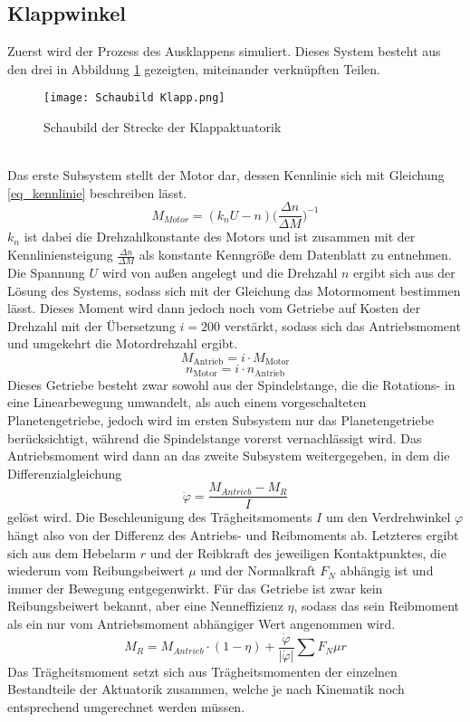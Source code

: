 \subsection{Klappwinkel}
Zuerst wird der Prozess des Ausklappens simuliert. Dieses System besteht aus den drei in Abbildung \ref{abb_klappStrecke} gezeigten, miteinander verknüpften Teilen. 
\begin{figure}[h] 
	\centering
	\texttt{[image: Schaubild Klapp.png]}
	\caption{Schaubild der Strecke der Klappaktuatorik}
	\label{abb_klappStrecke}
\end{figure}\\
Das erste Subsystem stellt der Motor dar, dessen Kennlinie sich mit Gleichung \ref{eq_kennlinie} beschreiben lässt.
\begin{equation}\label{eq_kennlinie}
	M_{Motor} = (k_nU-n)\bigg(\frac{\Delta n}{\Delta M}\bigg)^{-1}
\end{equation}
$k_n$ ist dabei die Drehzahlkonstante des Motors und ist zusammen mit der Kennliniensteigung $\frac{\Delta n}{\Delta M}$ als konstante Kenngröße dem Datenblatt zu entnehmen. Die Spannung $U$ wird von außen angelegt und die Drehzahl $n$ ergibt sich aus der Lösung des Systems, sodass sich mit der Gleichung das Motormoment bestimmen lässt. Dieses Moment wird dann jedoch noch vom Getriebe auf Kosten der Drehzahl mit der Übersetzung $i = 200$ verstärkt, sodass sich das Antriebsmoment und umgekehrt die Motordrehzahl ergibt.
\begin{equation}
	M_\mathrm{Antrieb} = i \cdot M_\mathrm{Motor}
\end{equation}
\begin{equation}
	n_\mathrm{Motor} = i \cdot n_\mathrm{Antrieb}
\end{equation}
 Dieses Getriebe besteht zwar sowohl aus der Spindelstange, die die Rotations- in eine Linearbewegung umwandelt, als auch einem vorgeschalteten Planetengetriebe, jedoch wird im ersten Subsystem nur das Planetengetriebe berücksichtigt, während die Spindelstange vorerst vernachlässigt wird. Das Antriebsmoment wird dann an das zweite Subsystem weitergegeben, in dem die Differenzialgleichung
\begin{equation}
	\ddot{\varphi} = \frac{M_{Antrieb} - M_{R}}{I}
\end{equation}
gelöst wird. Die Beschleunigung des Trägheitsmoments $I$ um den Verdrehwinkel $\varphi$ hängt also von der Differenz des Antriebs- und Reibmoments ab. Letzteres ergibt sich aus dem Hebelarm $r$ und der Reibkraft des jeweiligen Kontaktpunktes, die wiederum vom Reibungsbeiwert $\mu$ und der Normalkraft $F_N$ abhängig ist und immer der Bewegung entgegenwirkt. Für das Getriebe ist zwar kein Reibungsbeiwert bekannt, aber eine Nenneffizienz $\eta$, sodass das sein Reibmoment als ein nur vom Antriebsmoment abhängiger Wert angenommen wird.
\begin{equation}\label{eq_reibmoment}
	M_R = M_{Antrieb}\cdot(1-\eta)+\frac{\dot{\varphi}}{|\dot{\varphi}|}\sum F_N \mu r
\end{equation}
Das Trägheitsmoment setzt sich aus Trägheitsmomenten der einzelnen Bestandteile der Aktuatorik zusammen, welche je nach Kinematik noch entsprechend umgerechnet werden müssen.

